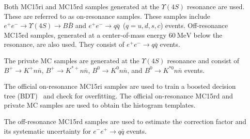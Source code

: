 Both MC15ri and MC15rd samples generated at the $\Upsilon(4S)$ resonance are used.
These are referred to as on-resonance samples.
These samples include $e^{+}e^{-}\to\Upsilon(4S)\to B\bar{B}$ and $e^{+}e^{-}\to q\bar{q}$~($q=u,d,s,c$) events.
Off-resonance MC15rd samples, generated at a center-of-mass energy $60~\mathrm{MeV}$ below the resonance, are also used.
They consist of $e^{+}e^{-}\to q\bar{q}$ events.

The private MC samples are generated at the $\Upsilon(4S)$ resonance and consist of $B^{+}\to K^{+}n\bar{n}$, $B^{+}\to K^{*+}n\bar{n}$, $B^{0}\to K^{0}n\bar{n}$, and $B^{0}\to K^{*0}n\bar{n}$ events.

The official on-resonance MC15ri samples are used to train a boosted decision tree (BDT)~\cite{Keck:2017gsv} and check for overfitting.
The official on-resonance MC15rd and private MC samples are used to obtain the histogram templates.

The off-resonance MC15rd samples are used to estimate the correction factor and its systematic uncertainty for $e^{-}e^{+}\rightarrow q\bar{q}$ events.


